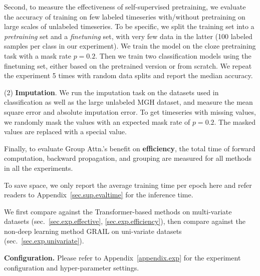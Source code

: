 
Second, to measure the effectiveness of self-supervised pretraining, we evaluate the accuracy of training on few labeled timeseries with/without pretraining on large scales of unlabeled timeseries. 
To be specific, we split the training set into a {\it pretraining} set and a {\it finetuning} set, with very few data in the latter (100 labeled samples per class in our experiment). 
We train the model on the cloze pretraining task with a mask rate $p=0.2$. 
Then we train two classification models using the finetuning set, either based on the pretrained version or from scratch. We repeat the experiment 5 times with random data splits and report the median accuracy. 


(2) \textbf{Imputation}. We run the imputation task on the datasets used in classification as well as the large unlabeled MGH dataset, and measure the mean square error and absolute imputation error. To get timeseries with missing values, we randomly mask the values with an expected mask rate of $p=0.2$. The masked values are replaced with a special value. 

Finally, to evaluate Group Attn.'s benefit on {\bf efficiency}, the total time of forward computation, backward propagation, and grouping are measured for all methods in all the experiments. 

To save space, we only report the average training time per epoch here and refer readers to Appendix~\ref{sec.sup.evaltime} for the inference time.

We first compare against the Transformer-based methods on multi-variate datasets (sec.~\ref{sec.exp.effective}, \ref{sec.exp.efficiency}), then compare against the non-deep learning method GRAIL on uni-variate datasets (sec.~\ref{sec.exp.univariate}).

\noindent\textbf{Configuration.} Please refer to Appendix~\ref{appendix.exp} for the experiment configuration and hyper-parameter settings.

